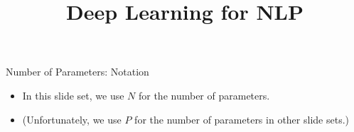 \documentclass[11pt,compress,t,notes=noshow, xcolor=table]{beamer}
\title{Deep Learning for NLP}
\begin{document}






\begin{vbframe}{Number of Parameters: Notation}

\vfill

\begin{itemize}
\item In this slide set, we use $N$ for the number of parameters.
\item (Unfortunately,  we use $P$ for the number of
  parameters in other slide sets.)
\end{itemize}

\vfill
    
\end{vbframe}

\end{document}
